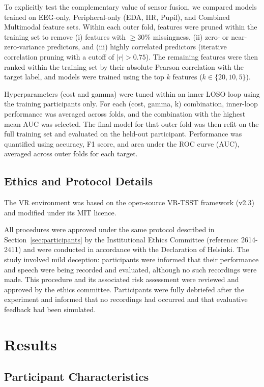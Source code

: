 \documentclass[lettersize,journal]{IEEEtran}
\begin{document}
To explicitly test the complementary value of sensor fusion, we compared models trained on EEG-only, Peripheral-only (EDA, HR, Pupil), and Combined Multimodal feature sets.
Within each outer fold, features were pruned within the training set to remove (i) features with $\geq 30\%$ missingness, (ii) zero- or near-zero-variance predictors, and (iii) highly correlated predictors (iterative correlation pruning with a cutoff of $|r|>0.75$). The remaining features were then ranked within the training set by their absolute Pearson correlation with the target label, and models were trained using the top $k$ features ($k \in \{20,10,5\}$).

Hyperparameters (cost and gamma) were tuned within an inner LOSO loop using the training participants only. For each (cost, gamma, k) combination, inner-loop performance was averaged across folds, and the combination with the highest mean AUC was selected. The final model for that outer fold was then refit on the full training set and evaluated on the held-out participant. Performance was quantified using accuracy, F1 score, and area under the ROC curve (AUC), averaged across outer folds for each target.


\subsection{Ethics and Protocol Details}
The VR environment was based on the open-source VR-TSST framework (v2.3) and modified under its MIT licence.

All procedures were approved under the same protocol described in Section~\ref{sec:participants} by the Institutional Ethics Committee (reference: 2614-2411) and were conducted in accordance with the Declaration of Helsinki. 
The study involved mild deception: participants were informed that their performance and speech were being recorded and evaluated, although no such recordings were made. 
This procedure and its associated risk assessment were reviewed and approved by the ethics committee. 
Participants were fully debriefed after the experiment and informed that no recordings had occurred and that evaluative feedback had been simulated.

\section{Results}

\subsection {Participant Characteristics}
\end{document}
